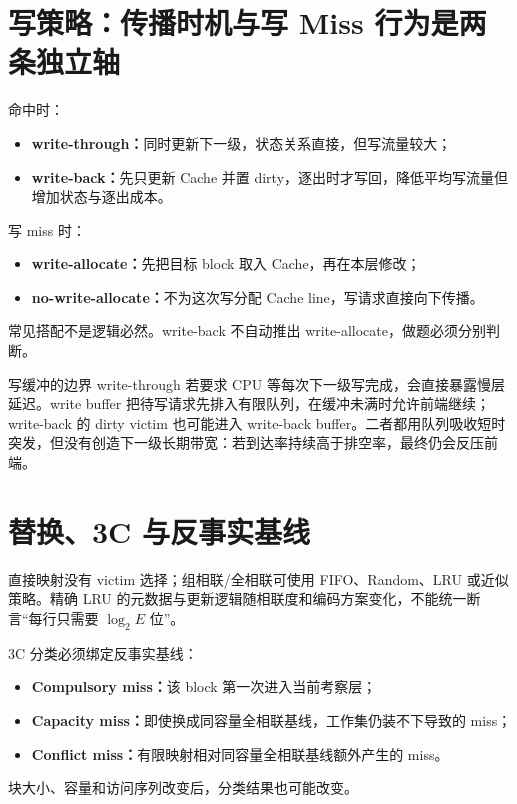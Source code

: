 \documentclass[UTF8,fontset=fandol,11pt,a4paper]{ctexart}
\newcommand{\kw}[1]{\textbf{\color{deep}#1}}\newcommand{\code}[1]{\texttt{#1}}
\begin{document}
\section{写策略：传播时机与写 Miss 行为是两条独立轴}
命中时：
\begin{itemize}
\item \kw{write-through：}同时更新下一级，状态关系直接，但写流量较大；
\item \kw{write-back：}先只更新 Cache 并置 dirty，逐出时才写回，降低平均写流量但增加状态与逐出成本。
\end{itemize}
写 miss 时：
\begin{itemize}
\item \kw{write-allocate：}先把目标 block 取入 Cache，再在本层修改；
\item \kw{no-write-allocate：}不为这次写分配 Cache line，写请求直接向下传播。
\end{itemize}
常见搭配不是逻辑必然。write-back 不自动推出 write-allocate，做题必须分别判断。

\begin{center}

\end{center}

\begin{methodbox}{写缓冲的边界}
write-through 若要求 CPU 等每次下一级写完成，会直接暴露慢层延迟。write buffer 把待写请求先排入有限队列，在缓冲未满时允许前端继续；write-back 的 dirty victim 也可能进入 write-back buffer。二者都用队列吸收短时突发，但没有创造下一级长期带宽：若到达率持续高于排空率，最终仍会反压前端。
\end{methodbox}

\section{替换、3C 与反事实基线}
直接映射没有 victim 选择；组相联/全相联可使用 FIFO、Random、LRU 或近似策略。精确 LRU 的元数据与更新逻辑随相联度和编码方案变化，不能统一断言“每行只需要 $\log_2E$ 位”。

3C 分类必须绑定反事实基线：
\begin{itemize}
\item \kw{Compulsory miss：}该 block 第一次进入当前考察层；
\item \kw{Capacity miss：}即使换成同容量全相联基线，工作集仍装不下导致的 miss；
\item \kw{Conflict miss：}有限映射相对同容量全相联基线额外产生的 miss。
\end{itemize}
块大小、容量和访问序列改变后，分类结果也可能改变。
\end{document}
